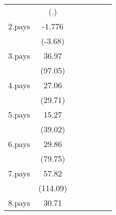 {\begin{tabular}{l*{6}{c}}
                    &         (.)         &                     &                     &                     &                     &                     \\
[1em]
2.pays              &      -1.776\sym{***}&                     &                     &                     &                     &                     \\
                    &     (-3.68)         &                     &                     &                     &                     &                     \\
[1em]
3.pays              &       36.97\sym{***}&                     &                     &                     &                     &                     \\
                    &     (97.05)         &                     &                     &                     &                     &                     \\
[1em]
4.pays              &       27.06\sym{***}&                     &                     &                     &                     &                     \\
                    &     (29.71)         &                     &                     &                     &                     &                     \\
[1em]
5.pays              &       15.27\sym{***}&                     &                     &                     &                     &                     \\
                    &     (39.02)         &                     &                     &                     &                     &                     \\
[1em]
6.pays              &       29.86\sym{***}&                     &                     &                     &                     &                     \\
                    &     (79.75)         &                     &                     &                     &                     &                     \\
[1em]
7.pays              &       57.82\sym{***}&                     &                     &                     &                     &                     \\
                    &    (114.09)         &                     &                     &                     &                     &                     \\
[1em]
8.pays              &       30.71\sym{***}&                     &                     &                     &                     &                     \\

\end{tabular}}
